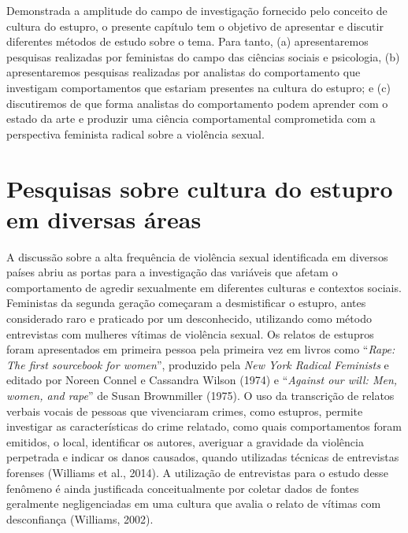 Demonstrada a amplitude do campo de investigação fornecido pelo conceito de cultura do estupro, o presente capítulo tem o objetivo de apresentar e discutir diferentes métodos de estudo sobre o tema. Para tanto, (a) apresentaremos pesquisas realizadas por feministas do cam\-po das ciências sociais e psicologia, (b) apresentaremos pesquisas realizadas por analistas do comportamento que investigam comportamentos que estariam presentes na cultura do estupro; e (c) discutiremos de que forma analistas do comportamento podem aprender com o estado da arte e produzir uma ciência comportamental comprometida com a perspectiva feminista radical sobre a violência sexual.

\section*{Pesquisas sobre cultura do estupro em diversas áreas}

A discussão sobre a alta frequência de violência sexual identificada em diversos países abriu as portas para a investigação das variáveis que afetam o comportamento de agredir sexualmente em diferentes culturas e contextos sociais. Feministas da segunda geração começaram a desmistificar o estupro, antes considerado raro e praticado por um desconhecido, utilizando como método entrevistas com mulheres vítimas de violência sexual. Os relatos de estupros foram apresentados em primeira pessoa pela primeira vez em livros como ``\textit{Rape: The first sourcebook for women}'', produzido pela \textit{New York Radical Feminists} e editado por Noreen Connel e Cassandra Wilson (1974) e ``\textit{Against our will: Men, women, and rape}'' de Susan Brownmiller (1975). O uso da transcrição de relatos verbais vocais de pessoas que vivenciaram crimes, como estupros, permite investigar as características do crime relatado, como quais comportamentos foram emitidos, o local, identificar os autores, averiguar a gravidade da violência perpetrada e indicar os danos causados, quando utilizadas técnicas de entrevistas forenses (Williams et al., 2014). A utilização de entrevistas para o estudo desse fenômeno é ainda justificada conceitualmente por coletar dados de fontes geralmente negligenciadas em uma cultura que avalia o relato de vítimas com desconfiança (Williams, 2002). 


